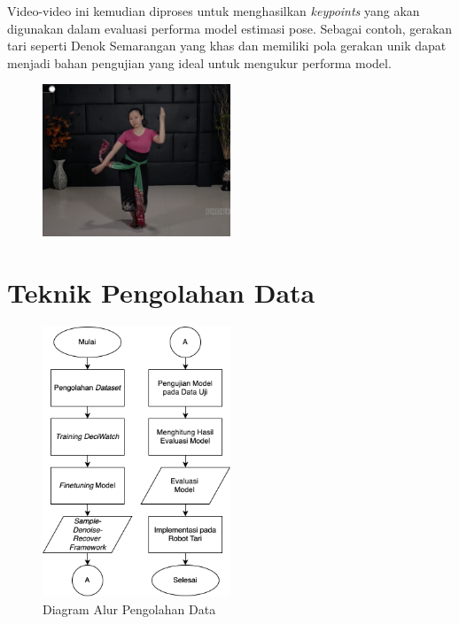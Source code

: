Video-video ini kemudian diproses untuk menghasilkan \textit{keypoints} yang akan digunakan dalam evaluasi performa model estimasi pose. Sebagai contoh, gerakan tari seperti Denok Semarangan yang khas dan memiliki pola gerakan unik dapat menjadi bahan pengujian yang ideal untuk mengukur performa model.

\begin{figure}[H]
    \centering
    \includegraphics[width=0.5\textwidth]{images/dance_traditional.png}
    \label{fig:traditional_dance}
\end{figure}

\section{Teknik Pengolahan Data}

\begin{figure}[H]
    \centering
    \includegraphics[width=0.5\textwidth]{images/flowchart_pengolahan.png}
    \caption{Diagram Alur Pengolahan Data}
    \label{fig:data_flowchart}
\end{figure}

